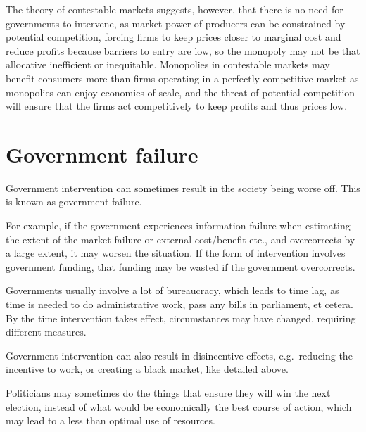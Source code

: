 \documentclass[Economics.tex]{subfiles}
\begin{document}
The theory of contestable markets suggests, however, that there is no need for governments to intervene, as market power of producers can be constrained by potential competition, forcing firms to keep prices closer to marginal cost and reduce profits because barriers to entry are low, so the monopoly may not be that allocative inefficient or inequitable. Monopolies in contestable markets may benefit consumers more than firms operating in a perfectly competitive market as monopolies can enjoy economies of scale, and the threat of potential competition will ensure that the firms act competitively to keep profits and thus prices low.
\section{Government failure}
Government intervention can sometimes result in the society being worse off. This is known as government failure.

For example, if the government experiences information failure when estimating the extent of the market failure or external cost\slash{}benefit etc., and overcorrects by a large extent, it may worsen the situation. If the form of intervention involves government funding, that funding may be wasted if the government overcorrects.

Governments usually involve a lot of bureaucracy, which leads to time lag, as time is needed to do administrative work, pass any bills in parliament, et cetera. By the time intervention takes effect, circumstances may have changed, requiring different measures.

Government intervention can also result in disincentive effects, e.g.\ reducing the incentive to work, or creating a black market, like detailed above.

Politicians may sometimes do the things that ensure they will win the next election, instead of what would be economically the best course of action, which may lead to a less than optimal use of resources.
\end{document}
